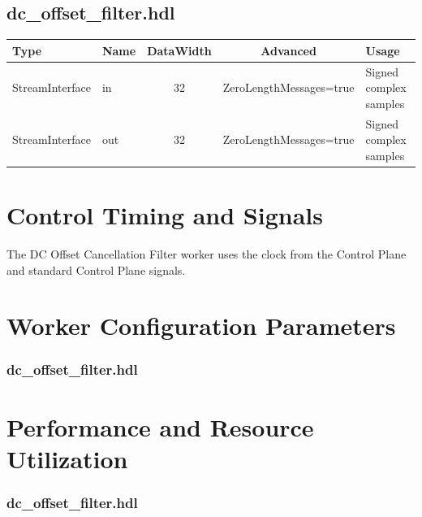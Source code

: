 \documentclass{article}
\def\comp{dc\_offset\_filter}
\edef\ecomp{dc_offset_filter}
\begin{document}
\begin{landscape}
		\subsection*{\comp.hdl}
		\begin{scriptsize}
			\begin{tabular}{|M{2cm}|M{1.5cm}|c|c|M{12cm}|}
				\hline
				Type            & Name & DataWidth & Advanced                & Usage                  \\
				\hline
				StreamInterface & in   & 32        & ZeroLengthMessages=true & Signed complex samples \\
				\hline
				StreamInterface & out  & 32        & ZeroLengthMessages=true & Signed complex samples \\
				\hline
			\end{tabular}
		\end{scriptsize}
	\end{landscape}

	\section*{Control Timing and Signals}
	\begin{flushleft}
		The DC Offset Cancellation Filter worker uses the clock from the Control Plane and standard Control Plane signals.
	\end{flushleft}

\begin{landscape}
\section*{Worker Configuration Parameters}
\subsubsection*{\comp.hdl}

\section*{Performance and Resource Utilization}
\subsubsection*{\comp.hdl}

\end{landscape}
\end{document}
